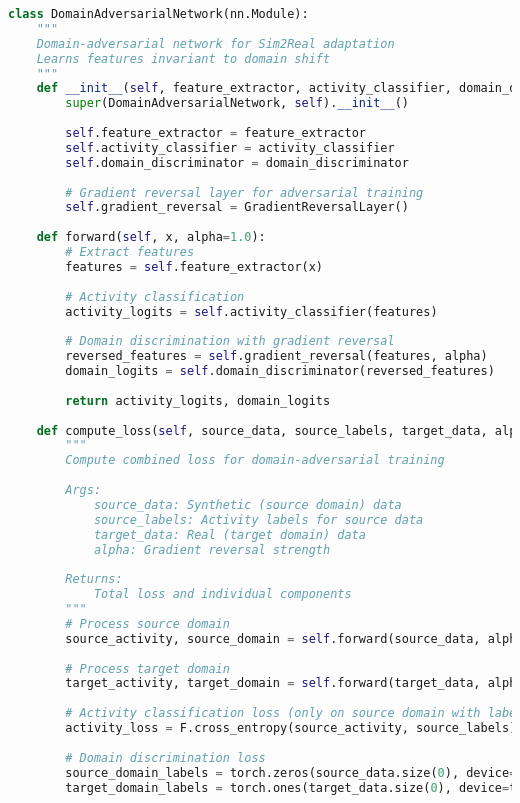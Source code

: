 \documentclass[journal]{IEEEtran}
\begin{document}
\begin{lstlisting}[language=Python, caption=Domain-Adversarial Training Framework]
class DomainAdversarialNetwork(nn.Module):
    """
    Domain-adversarial network for Sim2Real adaptation
    Learns features invariant to domain shift
    """
    def __init__(self, feature_extractor, activity_classifier, domain_discriminator):
        super(DomainAdversarialNetwork, self).__init__()
        
        self.feature_extractor = feature_extractor
        self.activity_classifier = activity_classifier
        self.domain_discriminator = domain_discriminator
        
        # Gradient reversal layer for adversarial training
        self.gradient_reversal = GradientReversalLayer()
        
    def forward(self, x, alpha=1.0):
        # Extract features
        features = self.feature_extractor(x)
        
        # Activity classification
        activity_logits = self.activity_classifier(features)
        
        # Domain discrimination with gradient reversal
        reversed_features = self.gradient_reversal(features, alpha)
        domain_logits = self.domain_discriminator(reversed_features)
        
        return activity_logits, domain_logits
    
    def compute_loss(self, source_data, source_labels, target_data, alpha=1.0):
        """
        Compute combined loss for domain-adversarial training
        
        Args:
            source_data: Synthetic (source domain) data
            source_labels: Activity labels for source data
            target_data: Real (target domain) data
            alpha: Gradient reversal strength
        
        Returns:
            Total loss and individual components
        """
        # Process source domain
        source_activity, source_domain = self.forward(source_data, alpha)
        
        # Process target domain
        target_activity, target_domain = self.forward(target_data, alpha)
        
        # Activity classification loss (only on source domain with labels)
        activity_loss = F.cross_entropy(source_activity, source_labels)
        
        # Domain discrimination loss
        source_domain_labels = torch.zeros(source_data.size(0), device=source_data.device)
        target_domain_labels = torch.ones(target_data.size(0), device=target_data.device)
        

\end{lstlisting}
\end{document}
